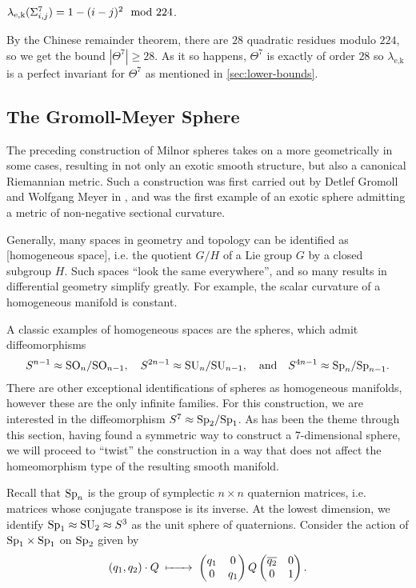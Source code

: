 \begin{corollary}
	$\lambda_{\mathrm{e,k}}(\Sigma^7_{i,j})=1-(i-j)^2\mod 224$.
\end{corollary}

By the Chinese remainder theorem, there are $28$ quadratic residues modulo $224$, so we get the bound $|\Theta^7|\geq 28$. As it so happens, $\Theta^7$ is exactly of order $28$ so $\lambda_{\textrm{e,k}}$ is a perfect invariant for $\Theta^7$ as mentioned in \cref{sec:lower-bounds}.

\subsection{The Gromoll-Meyer Sphere}\label{sec:gromoll-meyer}

The preceding construction of Milnor spheres takes on a more geometrically in some cases, resulting in not only an exotic smooth structure, but also a canonical Riemannian metric. Such a construction was first carried out by Detlef Gromoll and Wolfgang Meyer in \cite{gromollmeyer1974curvature}, and was the first example of an exotic sphere admitting a metric of non-negative sectional curvature.

Generally, many spaces in geometry and topology can be identified as [homogeneous space], i.e. the quotient $G/H$ of a Lie group $G$ by a closed subgroup $H$. Such spaces ``look the same everywhere'', and so many results in differential geometry simplify greatly. For example, the scalar curvature of a homogeneous manifold is constant.

A classic examples of homogeneous spaces are the spheres, which admit diffeomorphisms
\[
	S^{n-1}\approx \mathrm{SO}_n/\mathrm{SO}_{n-1},\quad S^{2n-1}\approx \mathrm{SU}_n/\mathrm{SU}_{n-1},\quad\textrm{and}\quad S^{4n-1}\approx \mathrm{Sp}_n/\mathrm{Sp}_{n-1}.
\]
There are other exceptional identifications of spheres as homogeneous manifolds, however these are the only infinite families. For this construction, we are interested in the diffeomorphism $S^7\approx \mathrm{Sp}_2/\mathrm{Sp}_1$. As has been the theme through this section, having found a symmetric way to construct a 7-dimensional sphere, we will proceed to ``twist'' the construction in a way that does not affect the homeomorphism type of the resulting smooth manifold.

Recall that $\mathrm{Sp}_n$ is the group of symplectic $n\times n$ quaternion matrices, i.e. matrices whose conjugate transpose is its inverse. At the lowest dimension, we identify $\mathrm{Sp}_1\approx \mathrm{SU}_2\approx S^3$ as the unit sphere of quaternions. Consider the action of $\mathrm{Sp}_1\times \mathrm{Sp}_1$ on $\mathrm{Sp}_2$ given by
\begin{equation}\label{eq:gromoll-meyer-action}
	(q_1, q_2)\cdot Q \lkxmapsto \begin{pmatrix} q_1 & 0\\ 0 & q_1\end{pmatrix}Q\begin{pmatrix}\overline{q_2} & 0\\ 0 & 1\end{pmatrix}.
\end{equation}

